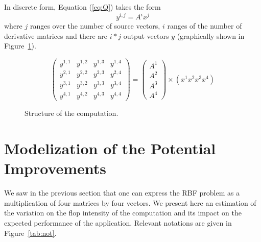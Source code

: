 \documentclass[10pt,conference,compsocconf]{IEEEtran}
\newcommand{\todo}[1]{{\color{red}\textbf{\hl{#1}}\xspace}}
\begin{document}
In discrete form, Equation (\ref{eq:Q}) takes the form
$$
  y^{i,j} = A^i x^j 
$$ where $j$ ranges over the number of source vectors, $i$ ranges of
  the number of derivative matrices and there are $i*j$ output vectors
  $y$ (graphically shown in Figure~\ref{fig:struct_comp}).

\begin{figure}
  \centering

  \[ \left( \begin{array}{cccc}
    y^{1,1} & y^{1,2} & y^{1,3} & y^{1,4} \\
    y^{2,1} & y^{2,2} & y^{2,3} & y^{2,4} \\
    y^{3,1} & y^{3,2} & y^{3,3} & y^{3,4} \\
    y^{4,1} & y^{4,2} & y^{4,3} & y^{4,4} 
  \end{array} \right)
  = \left(
  \begin{array}{c}
    A^1\\
    A^2\\
    A^3\\
    A^4
  \end{array}\right)
  \times \left(x^1 x^2 x^3 x^4 \right) \] 
  
  \caption{Structure of the computation.}
  \label{fig:struct_comp}
\end{figure}


\section{Modelization of the Potential Improvements}
\label{sec:model}

We saw in the previous section that one can express the RBF problem as
a multiplication of four matrices by four vectors. We present here an
estimation of the variation on the flop intensity of the computation
and its impact on the expected performance of the
application. Relevant notations are given in Figure~\ref{tab:not}.
\end{document}
